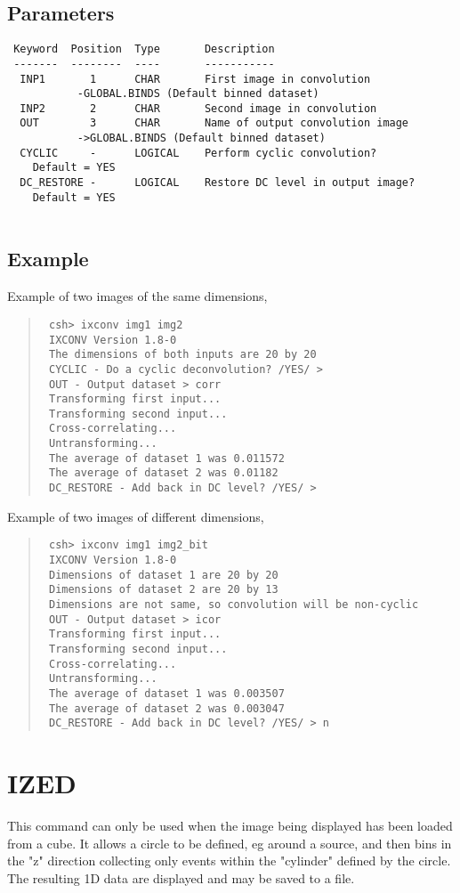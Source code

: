 \documentclass{book}
\renewcommand{\_}{{\tt\char'137}}     %
\begin{document}
\subsection{Parameters}
\begin{verbatim}
 Keyword  Position  Type       Description
 -------  --------  ----       -----------
  INP1       1      CHAR       First image in convolution
           -GLOBAL.BINDS (Default binned dataset)
  INP2       2      CHAR       Second image in convolution
  OUT        3      CHAR       Name of output convolution image
           ->GLOBAL.BINDS (Default binned dataset)
  CYCLIC     -      LOGICAL    Perform cyclic convolution?
    Default = YES
  DC_RESTORE -      LOGICAL    Restore DC level in output image?
    Default = YES
 
\end{verbatim}\subsection{Example}
Example of two images of the same dimensions,
\begin{quote}\begin{verbatim}
 csh> ixconv img1 img2
 IXCONV Version 1.8-0
 The dimensions of both inputs are 20 by 20
 CYCLIC - Do a cyclic deconvolution? /YES/ >
 OUT - Output dataset > corr
 Transforming first input...
 Transforming second input...
 Cross-correlating...
 Untransforming...
 The average of dataset 1 was 0.011572
 The average of dataset 2 was 0.01182
 DC_RESTORE - Add back in DC level? /YES/ >
 \end{verbatim}\end{quote}
Example of two images of different dimensions,
\begin{quote}\begin{verbatim}
 csh> ixconv img1 img2_bit
 IXCONV Version 1.8-0
 Dimensions of dataset 1 are 20 by 20
 Dimensions of dataset 2 are 20 by 13
 Dimensions are not same, so convolution will be non-cyclic
 OUT - Output dataset > icor
 Transforming first input...
 Transforming second input...
 Cross-correlating...
 Untransforming...
 The average of dataset 1 was 0.003507
 The average of dataset 2 was 0.003047
 DC_RESTORE - Add back in DC level? /YES/ > n
 \end{verbatim}\end{quote}
\section{IZED}
This command can only be used when the image being displayed
has been loaded from a cube. It allows a circle to be defined,
eg around a source, and then bins in the "z" direction collecting
only events within the "cylinder" defined by the circle. The
resulting 1D data are displayed and may be saved to a file.
 
\end{document}
